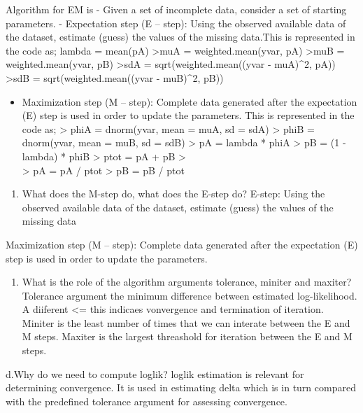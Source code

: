 \documentclass[]{article}
\providecommand{\tightlist}{%
  \setlength{\itemsep}{0pt}\setlength{\parskip}{0pt}}
\begin{document}
Algorithm for EM is - Given a set of incomplete data, consider a set of
starting parameters. - Expectation step (E -- step): Using the observed
available data of the dataset, estimate (guess) the values of the
missing data.This is represented in the code as; lambda = mean(pA)
\textgreater{}muA = weighted.mean(yvar, pA) \textgreater{}muB =
weighted.mean(yvar, pB) \textgreater{}sdA = sqrt(weighted.mean((yvar -
muA)\^{}2, pA)) \textgreater{}sdB = sqrt(weighted.mean((yvar -
muB)\^{}2, pB))

\begin{itemize}
\tightlist
\item
  Maximization step (M -- step): Complete data generated after the
  expectation (E) step is used in order to update the parameters. This
  is represented in the code as; \textgreater{} phiA = dnorm(yvar, mean
  = muA, sd = sdA) \textgreater{} phiB = dnorm(yvar, mean = muB, sd =
  sdB) \textgreater{} pA = lambda * phiA \textgreater{} pB = (1 -
  lambda) * phiB \textgreater{} ptot = pA + pB \textgreater{}\\
  \textgreater{} pA = pA / ptot \textgreater{} pB = pB / ptot
\end{itemize}

\begin{enumerate}
\def\labelenumi{\alph{enumi}.}
\setcounter{enumi}{1}
\tightlist
\item
  What does the M-step do, what does the E-step do? E-step: Using the
  observed available data of the dataset, estimate (guess) the values of
  the missing data
\end{enumerate}

Maximization step (M -- step): Complete data generated after the
expectation (E) step is used in order to update the parameters.

\begin{enumerate}
\def\labelenumi{\alph{enumi}.}
\setcounter{enumi}{2}
\tightlist
\item
  What is the role of the algorithm arguments tolerance, miniter and
  maxiter? Tolerance argument the minimum difference between estimated
  log-likelihood. A diiferent \textless{}= this indicaes vonvergence and
  termination of iteration. Miniter is the least number of times that we
  can interate between the E and M steps. Maxiter is the largest
  threashold for iteration between the E and M steps.
\end{enumerate}

d.Why do we need to compute loglik? loglik estimation is relevant for
determining convergence. It is used in estimating delta which is in turn
compared with the predefined tolerance argument for assessing
convergence.
\end{document}
